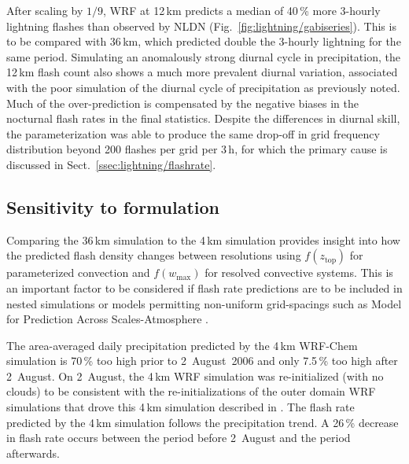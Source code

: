 After scaling by $1/9$, WRF at 12\,\unit{km} predicts a median of 40\,{\%}
more 3-hourly lightning flashes than observed by NLDN
(Fig.~\ref{fig:lightning/gabiseries}). This is to be compared with 36\,\unit{km}, which
predicted double the 3-hourly lightning for the same period. Simulating an
anomalously strong diurnal cycle in precipitation, the 12\,\unit{km} flash
count also shows a much more prevalent diurnal variation, associated with the
poor simulation of the diurnal cycle of precipitation as previously noted.
Much of the over-prediction is compensated by the negative biases in the
nocturnal flash rates in the final statistics. Despite the differences in
diurnal skill, the parameterization was able to produce the same drop-off in
grid frequency distribution beyond 200 flashes per grid per 3\,h, for which
the primary cause is discussed in Sect.~\ref{ssec:lightning/flashrate}.

\subsection{Sensitivity to formulation}\label{ssec:lightning/formsens}

Comparing the 36\,\unit{km} simulation to the 4\,\unit{km} simulation
provides insight into how the predicted flash density changes between
resolutions using $f(z_{\mathrm{top}})$ for parameterized convection and
$f(w_{\max})$ for resolved convective systems. This is an important factor to
be considered if flash rate predictions are to be included in nested
simulations or models permitting non-uniform grid-spacings such as Model for
Prediction Across Scales-Atmosphere \citep[MPAS-A;][]{Skamarock:2012fk}.

The area-averaged daily precipitation predicted by the 4\,\unit{km} WRF-Chem
simulation is 70\,{\%} too high prior to 2~August~2006 and only 7.5\,{\%} too high
after 2~August. On 2~August, the 4\,\unit{km} WRF simulation was
re-initialized (with no clouds) to be consistent with the re-initializations
of the outer domain WRF simulations that drove this 4\,\unit{km} simulation
described in \cite{Barth:2012qf}. The flash rate predicted by the
4\,\unit{km} simulation follows the precipitation trend. A 26\,{\%} decrease
in flash rate occurs between the period before 2~August and the period
afterwards.


